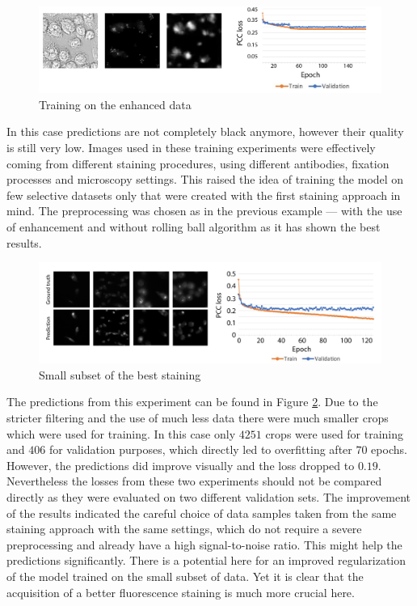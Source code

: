 \begin{figure}[htb]
	\begin{center}
		\includegraphics[width=\linewidth]{bilder/golgi/enhanced-crop.png}
		\caption{Training on the enhanced data}\label{fig:golgi-enhanced-predictions}
	\end{center}
\end{figure}
In this case predictions are not completely black anymore, however their quality is still very low. Images used in these training experiments were effectively coming from different staining procedures, using different antibodies, fixation processes and microscopy settings. This raised the idea of training the model on few selective datasets only that were created with the first staining approach in mind. The preprocessing was chosen as in the previous example --- with the use of enhancement and without rolling ball algorithm as it has shown the best results.

\begin{figure}[htb]
	\begin{center}
		\includegraphics[width=\linewidth]{bilder/golgi/12-13/12-13.png}
		\caption{Small subset of the best staining}\label{fig:12-13}
	\end{center}
\end{figure}

The predictions from this experiment can be found in Figure \ref{fig:12-13}. Due to the stricter filtering and the use of much less data there were much smaller crops which were used for training. In this case only $4251$ crops were used for training and $406$ for validation purposes, which directly led to overfitting after $70$ epochs. However, the predictions did improve visually and the loss dropped to $0.19$. Nevertheless the losses from these two experiments should not be compared directly as they were evaluated on two different validation sets. The improvement of the results indicated the careful choice of data samples taken from the same staining approach with the same settings, which do not require a severe preprocessing and already have a high signal-to-noise ratio. This might help the predictions significantly. There is a potential here for an improved regularization of the model trained on the small subset of data. Yet it is clear that the acquisition of a better fluorescence staining is much more crucial here.